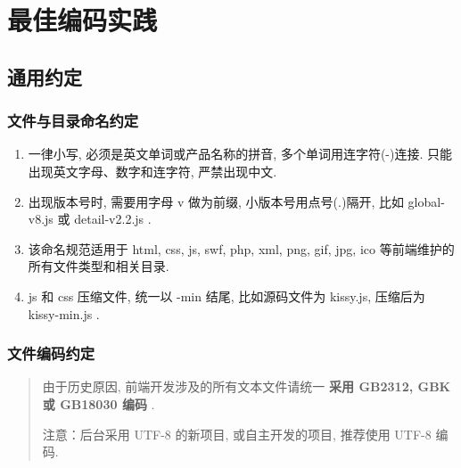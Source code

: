 \documentclass[letterpaper,10pt,english]{sphinxmanual}
\begin{document}
\chapter{最佳编码实践}
\label{styleguide/index:styleguide}\label{styleguide/index::doc}\label{styleguide/index:id1}

\section{通用约定}
\label{styleguide/common-conventions:styleguide-commonconventions}\label{styleguide/common-conventions::doc}\label{styleguide/common-conventions:id1}

\subsection{文件与目录命名约定}
\label{styleguide/common-conventions:id2}\begin{enumerate}
\item {}
一律小写, 必须是英文单词或产品名称的拼音, 多个单词用连字符(-)连接. 只能出现英文字母、数字和连字符, 严禁出现中文.

\item {}
出现版本号时, 需要用字母 v 做为前缀, 小版本号用点号(.)隔开, 比如 global-v8.js 或 detail-v2.2.js .

\item {}
该命名规范适用于 html, css, js, swf, php, xml, png, gif, jpg, ico 等前端维护的所有文件类型和相关目录.

\item {}
js 和 css 压缩文件, 统一以 -min 结尾, 比如源码文件为 kissy.js, 压缩后为 kissy-min.js .

\end{enumerate}


\subsection{文件编码约定}
\label{styleguide/common-conventions:id3}\begin{quote}

由于历史原因, 前端开发涉及的所有文本文件请统一 \textbf{采用 GB2312, GBK 或 GB18030 编码} .

注意：后台采用 UTF-8 的新项目, 或自主开发的项目, 推荐使用 UTF-8 编码.
\end{quote}
\end{document}
